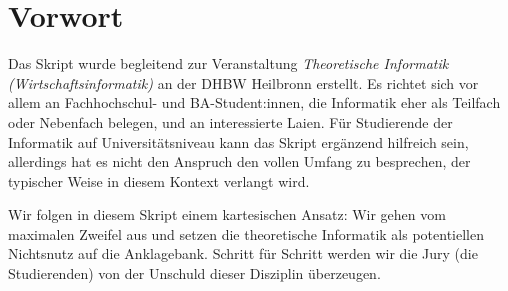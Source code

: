 \chapter{Vorwort}

Das Skript wurde begleitend zur Veranstaltung
\emph{Theoretische Informatik (Wirtschaftsinformatik)}
an der DHBW Heilbronn erstellt.
Es richtet sich vor allem an Fachhochschul- und BA-Student:innen,
die Informatik eher als Teilfach oder Nebenfach belegen, und an interessierte Laien.
Für Studierende der Informatik auf Universitätsniveau kann das Skript ergänzend hilfreich sein,
allerdings hat es nicht den Anspruch den vollen Umfang zu besprechen,
der typischer Weise in diesem Kontext verlangt wird.

Wir folgen in diesem Skript einem kartesischen Ansatz:
Wir gehen vom maximalen Zweifel aus und setzen die theoretische Informatik
als potentiellen Nichtsnutz auf die Anklagebank.
Schritt für Schritt werden wir die Jury (die Studierenden) von der Unschuld dieser
Disziplin überzeugen.
